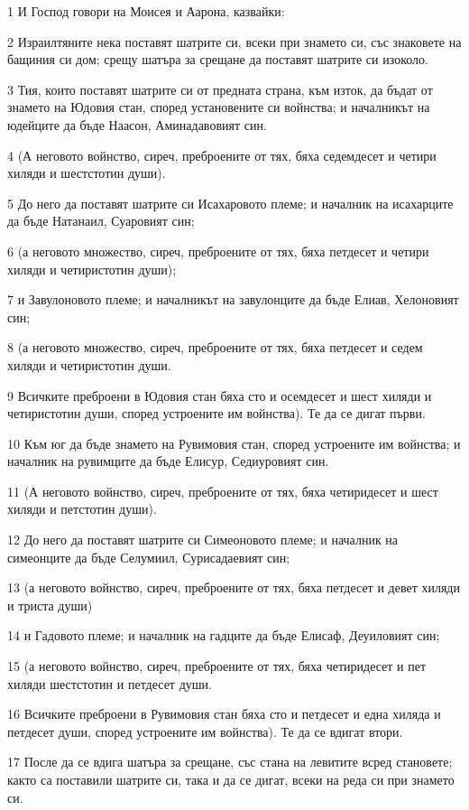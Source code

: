 \par 1 И Господ говори на Моисея и Аарона, казвайки:
\par 2 Израилтяните нека поставят шатрите си, всеки при знамето си, със знаковете на бащиния си дом; срещу шатъра за срещане да поставят шатрите си изоколо.
\par 3 Тия, които поставят шатрите си от предната страна, към изток, да бъдат от знамето на Юдовия стан, според установените си войнства; и началникът на юдейците да бъде Наасон, Аминадавовият син.
\par 4 (А неговото войнство, сиреч, преброените от тях, бяха седемдесет и четири хиляди и шестстотин души).
\par 5 До него да поставят шатрите си Исахаровото племе; и началник на исахарците да бъде Натанаил, Суаровият син;
\par 6 (а неговото множество, сиреч, преброените от тях, бяха петдесет и четири хиляди и четиристотин души);
\par 7 и Завулоновото племе; и началникът на завулонците да бъде Елиав, Хелоновият син;
\par 8 (а неговото множество, сиреч, преброените от тях, бяха петдесет и седем хиляди и четиристотин души.
\par 9 Всичките преброени в Юдовия стан бяха сто и осемдесет и шест хиляди и четиристотин души, според устроените им войнства). Те да се дигат първи.
\par 10 Към юг да бъде знамето на Рувимовия стан, според устроените им войнства; и началник на рувимците да бъде Елисур, Седиуровият син.
\par 11 (А неговото войнство, сиреч, преброените от тях, бяха четиридесет и шест хиляди и петстотин души).
\par 12 До него да поставят шатрите си Симеоновото племе; и началник на симеонците да бъде Селумиил, Сурисадаевият син;
\par 13 (а неговото войнство, сиреч, преброените от тях, бяха петдесет и девет хиляди и триста души)
\par 14 и Гадовото племе; и началник на гадците да бъде Елисаф, Деуиловият син;
\par 15 (а неговото войнство, сиреч, преброените от тях, бяха четиридесет и пет хиляди шестстотин и петдесет души.
\par 16 Всичките преброени в Рувимовия стан бяха сто и петдесет и една хиляда и петдесет души, според устроените им войнства). Те да се вдигат втори.
\par 17 После да се вдига шатъра за срещане, със стана на левитите всред становете; както са поставили шатрите си, така и да се дигат, всеки на реда си при знамето си.
